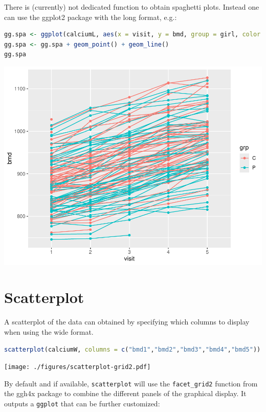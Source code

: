 \documentclass[12pt]{article}
\begin{document}
There is (currently) not dedicated function to obtain spaghetti
plots. Instead one can use the ggplot2 package with the long format, e.g.:
\begin{lstlisting}[language=r,numbers=none]
gg.spa <- ggplot(calciumL, aes(x = visit, y = bmd, group = girl, color = grp))
gg.spa <- gg.spa + geom_point() + geom_line()
gg.spa
\end{lstlisting}

\begin{center}
\includegraphics[trim={0 0 0 0},width=1\textwidth]{./figures/spaghetti.pdf}
\end{center}


\clearpage
\section{Scatterplot}
\label{sec:org8a2bfb8}


A scatterplot of the data can obtained by specifying which columns to
display when using the wide format. 
\begin{lstlisting}[language=r,numbers=none]
scatterplot(calciumW, columns = c("bmd1","bmd2","bmd3","bmd4","bmd5")) 
\end{lstlisting}

\begin{center}
\texttt{[image: ./figures/scatterplot-grid2.pdf]}
\end{center}

By default and if available, \texttt{scatterplot} will use the \texttt{facet\_grid2}
function from the ggh4x package to combine the different panels of the
graphical display. It outputs a \texttt{ggplot} that can be further
customized:
\end{document}
